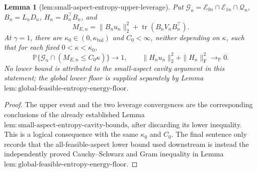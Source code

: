 \documentclass{article}
\newtheorem{lemma}{Lemma}
\begin{document}
\begin{lemma}[lem:small-aspect-entropy-upper-leverage]\label{lem:small-aspect-entropy-upper-leverage}
Put \(\mathcal G_n=\mathcal E_{0n}\cap\mathcal E_{1n}\cap\mathcal Q_n\), \(B_n=L_nD_n\), \(H_n=B_n^\top B_n\), and
\[
 M_{E,n}=\|B_nu_n\|_2^2+
 \operatorname{tr}(B_nV_nB_n^\top).
\]
At \(\gamma=1\), there are \(\kappa_0\in(0,\kappa_{\mathrm{bal}})\) and \(C_0<\infty\), neither depending on \(\kappa\), such that for each fixed \(0<\kappa<\kappa_0\),
\[
 \mathbb P\{\mathcal G_n\cap(M_{E,n}\le C_0\kappa)\}\to1,
 \qquad
 \|H_nu_n\|_2^2+\|H_n\|_{\mathrm F}^2
 \longrightarrow_{\mathbb P}0.
\]
No lower bound is attributed to the small-aspect cavity argument in this statement; the global lower floor is supplied separately by Lemma \(\mathrm{lem{:}global\mbox{-}feasible\mbox{-}entropy\mbox{-}energy\mbox{-}floor}\).
\end{lemma}
\begin{proof}
The upper event and the two leverage convergences are the corresponding conclusions of the already established Lemma \(\mathrm{lem{:}small\mbox{-}aspect\mbox{-}entropy\mbox{-}cavity\mbox{-}bounds}\), after discarding its lower inequality.  This is a logical consequence with the same \(\kappa_0\) and \(C_0\).  The final sentence only records that the all-feasible-aspect lower bound used downstream is instead the independently proved Cauchy--Schwarz and Gram inequality in Lemma \(\mathrm{lem{:}global\mbox{-}feasible\mbox{-}entropy\mbox{-}energy\mbox{-}floor}\).
\end{proof}
\end{document}
